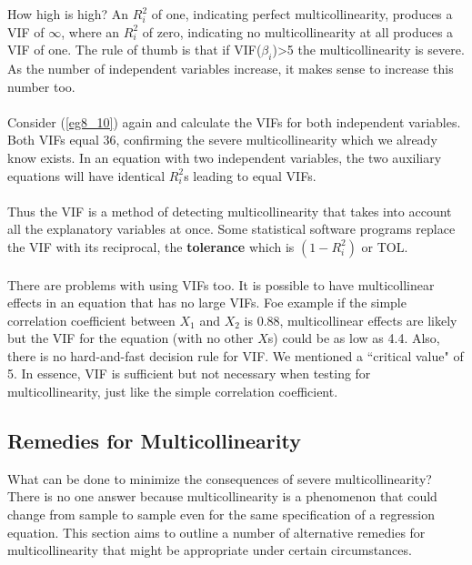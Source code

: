 \documentclass[11pt]{article}
\begin{document}
How high is high? An $R_i^2$ of one, indicating perfect multicollinearity, produces a VIF of $\infty$, where an $R_i^2$ of zero, indicating no multicollinearity at all produces a VIF of one. The rule of thumb is that if VIF($\beta_i$)>5 the multicollinearity is severe. As the number of independent variables increase, it makes sense to increase this number too.\\ \\
Consider (\ref{eg8_10}) again and calculate the VIFs for both independent variables. Both VIFs equal 36, confirming the severe multicollinearity which we already know exists. In an equation with two independent variables, the two auxiliary equations will have identical $R_i^2$s leading to equal VIFs.\\ \\
Thus the VIF is a method of detecting multicollinearity that takes into account all the explanatory variables at once. Some statistical software programs replace the VIF with its reciprocal, the \textbf{tolerance} which is $(1-R_i^2)$ or TOL.\\ \\
There are problems with using VIFs too. It is possible to have multicollinear effects in an equation that has no large VIFs. Foe example if the simple correlation coefficient between $X_1$ and $X_2$ is 0.88, multicollinear effects are likely but the VIF for the equation (with no other $X$s) could be as low as 4.4. Also, there is no hard-and-fast decision rule for VIF. We mentioned a ``critical value" of 5. In essence, VIF is sufficient but not necessary when testing for multicollinearity, just like the simple correlation coefficient.
\subsection{Remedies for Multicollinearity}
What can be done to minimize the consequences of severe multicollinearity? There is no one answer because multicollinearity is a phenomenon that could change from sample to sample even for the same specification of a regression equation. This section aims to outline a number of alternative remedies for multicollinearity that might be appropriate under certain circumstances.
\end{document}
